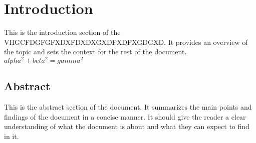 \documentclass[UTF8]{ctexart}
\begin{document}
\section*{Introduction}
This is the introduction section of the VHGCFDGFGFXDXFDXDXGXDFXDFXGDGXD. It provides an overview of the topic and sets the context for the rest of the document.\\
$alpha^2 + beta^2 = gamma^2$
\subsection*{Abstract}
This is the abstract section of the document. It summarizes the main points and findings of the document in a concise manner. It should give the reader a clear understanding of what the document is about and what they can expect to find in it.
\end{document}
